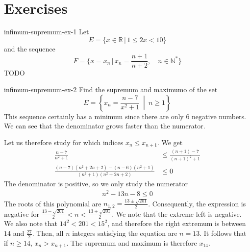 \documentclass[preview]{standalone}
\begin{document}
\genpage

\section{Exercises}


\begin{snippetexercise}{infimum-supremum-ex-1}{}
    Let
    \[
        E = \{ x\in\mathbb{R} \,|\, 1 \leq 2x < 10 \}
    \]
    and the sequence \[
        F = \{ x = x_n \,|\, x_n = \frac{n + 1}{n + 2}, \quad n\in\mathbb{N}^* \}
    \]
    TODO
\end{snippetexercise}

\begin{snippetexercise}{infimum-supremum-ex-2}{}
    Find the supremum and maximumo of the set
    \[
        E = \left\{ x_n = \frac{n-7}{x^2 + 1} \ \middle|\ n \geq 1 \right\}
    \]
    This sequence certainly has a minimum since there are only \(6\) negative numbers.
    We can see that the denominator grows faster than the numerator.

    Let us therefore study for which indices \(x_n \leq x_{n+1}\). We get
    \begin{align*}
        \frac{n-7}{n^2 + 1} &\leq \frac{(n+1)-7}{{(n+1)}^2 + 1} \\
        \frac{(n-7)(n^2 + 2n + 2) - (n-6)(n^2+1)}{(n^2 + 1)(n^2 + 2n + 2)} &\leq 0
    \end{align*}
    The denominator is positive, so we only study the numerator
    \begin{align*}
        n^2 - 13n - 8 \leq 0
    \end{align*}
    The roots of this polynomial are \(n_{1,2}= \frac{13\pm\sqrt{201}}{2}\).
    Consequently, the expression is negative for \(\frac{13-\sqrt{201}}{2} < n < \frac{13+\sqrt{201}}{2}\).
    We note that the extreme left is negative. We also note that \(14^2 < 201 < 15^2\),
    and therefore the right extremum is between \(14\) and \(\frac{27}{2}\).
    Then, all \(n\) integers satisfying the equation are
    \(n=13\). It follows that if \(n \geq 14\), \(x_n > x_{n+1}\).
    The supremum and maximum is therefore \(x_{14}\).
\end{snippetexercise}
\end{document}
